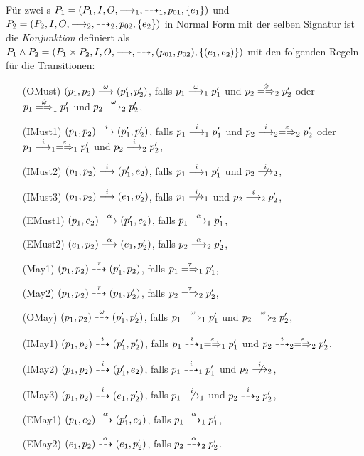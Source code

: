 \begin{Def}[Konjunktion]
  \label{ConjDef}
  Für zwei \MEIO{}s $P_1 = (P_1,I,O,\must _1,\may _1,p_{01},\{e_1\})$ und $P_2
  = (P_2,I,O,\must _2,\may _2,p_{02},\{e_2\})$ in Normal Form mit der selben
  Signatur ist die \emph{Konjunktion} definiert als $P_1\land P_2 =
  (P_1\times P_2, I, O, \must, \may ,(p_{01},p_{02}),\{(e_1,e_2)\})$ mit den
  folgenden Regeln für die Transitionen:
  \begin{itemize}
    \item[(OMust)] $(p_1,p_2) \must[\omega] (p'_1,p'_2)$, falls
      $p_1 \must[\omega]_1 p'_1$ und $p_2 \weakmay[\hat{\omega}]_2 p'_2$ oder
      $p_1 \weakmay[\hat{\omega}]_1 p'_1$ und $p_2 \must[\omega]_2 p'_2$,
    \item[(IMust1)] $(p_1,p_2) \must[i] (p'_1,p'_2)$, falls $p_1 \must[i]_1
      p'_1$ und $p_2 \must[i]_2 \weakmay[\varepsilon]_2 p'_2$ oder $p_1
      \must[i]_1 \weakmay[\varepsilon]_1 p'_1$ und $p_2 \must[i]_2 p'_2$,
    \item[(IMust2)] $(p_1,p_2) \must[i] (p'_1,e_2)$, falls $p_1 \must[i]_1
      p'_1$ und $p_2 \nmust[i]_2$,
    \item[(IMust3)] $(p_1,p_2) \must[i] (e_1,p'_2)$, falls $p_1 \nmust[i]_1$
      und $p_2 \must[i]_2 p'_2$,
    \item[(EMust1)] $(p_1,e_2) \must[\alpha] (p'_1,e_2)$, falls $p_1
      \must[\alpha]_1 p'_1$,
    \item[(EMust2)] $(e_1,p_2) \must[\alpha] (e_1,p'_2)$, falls $p_2
      \must[\alpha]_2 p'_2$,
    \item[(May1)] $(p_1,p_2) \may[\tau] (p'_1,p_2)$, falls $p_1
      \weakmay[\tau]_1 p'_1$,
    \item[(May2)] $(p_1,p_2) \may[\tau] (p_1,p'_2)$, falls $p_2
      \weakmay[\tau]_2 p'_2$,
    \item[(OMay)] $(p_1,p_2) \may[\omega] (p'_1,p'_2)$, falls $p_1
      \weakmay[\omega]_1 p'_1$ und $p_2 \weakmay[\omega]_2 p'_2$,
    \item[(IMay1)] $(p_1,p_2) \may[i] (p'_1,p'_2)$, falls $p_1 \may[i]_1
      \weakmay[\varepsilon]_1 p'_1$ und $p_2 \may[i]_2 \weakmay[\varepsilon]_2
      p'_2$,
    \item[(IMay2)] $(p_1,p_2) \may[i] (p'_1,e_2)$, falls $p_1 \may[i]_1 p'_1$
      und $p_2 \nmust[i]_2$,
    \item[(IMay3)] $(p_1,p_2) \may[i] (e_1,p'_2)$, falls $p_1 \nmust[i]_1$ und
      $p_2 \may[i]_2 p'_2$,
    \item[(EMay1)] $(p_1,e_2) \may[\alpha] (p'_1,e_2)$, falls $p_1
      \may[\alpha]_1 p'_1$,
    \item[(EMay2)] $(e_1,p_2) \may[\alpha] (e_1,p'_2)$, falls $p_2
      \may[\alpha]_2 p'_2$.
  \end{itemize}
\end{Def}

